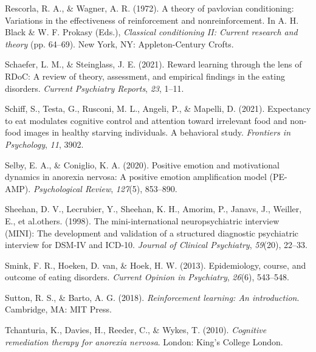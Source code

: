 \documentclass[
  man,floatsintext]{apa6}
\newlength{\cslhangindent}
\newlength{\cslentryspacingunit} %
\newenvironment{CSLReferences}[2] %
 {%
  \setlength{\parindent}{0pt}
  \ifodd #1
  \let\oldpar\par
  \def\par{\hangindent=\cslhangindent\oldpar}
  \fi
  \setlength{\parskip}{#2\cslentryspacingunit}
 }%
 {}
\begin{document}
\begin{CSLReferences}{1}{0}
\leavevmode{}%
Rescorla, R. A., \& Wagner, A. R. (1972). A theory of pavlovian conditioning: Variations in the effectiveness of reinforcement and nonreinforcement. In A. H. Black \& W. F. Prokasy (Eds.), \emph{Classical conditioning II: Current research and theory} (pp. 64--69). New York, NY: Appleton-Century Crofts.

\leavevmode{}%
Schaefer, L. M., \& Steinglass, J. E. (2021). Reward learning through the lens of RDoC: A review of theory, assessment, and empirical findings in the eating disorders. \emph{Current Psychiatry Reports}, \emph{23}, 1--11.

\leavevmode{}%
Schiff, S., Testa, G., Rusconi, M. L., Angeli, P., \& Mapelli, D. (2021). Expectancy to eat modulates cognitive control and attention toward irrelevant food and non-food images in healthy starving individuals. A behavioral study. \emph{Frontiers in Psychology}, \emph{11}, 3902.

\leavevmode{}%
Selby, E. A., \& Coniglio, K. A. (2020). Positive emotion and motivational dynamics in anorexia nervosa: A positive emotion amplification model (PE-AMP). \emph{Psychological Review}, \emph{127}(5), 853--890.

\leavevmode{}%
Sheehan, D. V., Lecrubier, Y., Sheehan, K. H., Amorim, P., Janavs, J., Weiller, E., et al.others. (1998). The mini-international neuropsychiatric interview (MINI): The development and validation of a structured diagnostic psychiatric interview for DSM-IV and ICD-10. \emph{Journal of Clinical Psychiatry}, \emph{59}(20), 22--33.

\leavevmode{}%
Smink, F. R., Hoeken, D. van, \& Hoek, H. W. (2013). Epidemiology, course, and outcome of eating disorders. \emph{Current Opinion in Psychiatry}, \emph{26}(6), 543--548.

\leavevmode{}%
Sutton, R. S., \& Barto, A. G. (2018). \emph{Reinforcement learning: An introduction}. Cambridge, MA: MIT Press.

\leavevmode{}%
Tchanturia, K., Davies, H., Reeder, C., \& Wykes, T. (2010). \emph{Cognitive remediation therapy for anorexia nervosa}. London: King's College London.


\end{CSLReferences}
\end{document}
